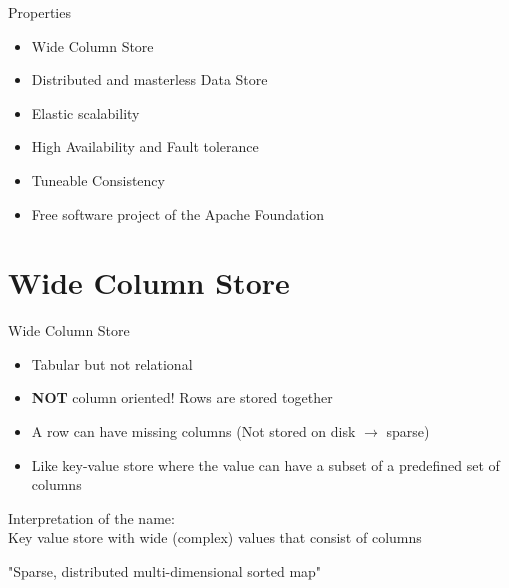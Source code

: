 \documentclass[
  10pt
]{beamer}
\begin{document}
\begin{frame}{Properties}
  \begin{itemize}
    \item<1-> Wide Column Store
    \item<2-> Distributed and masterless Data Store
    \item<4-> Elastic scalability
    \item<5-> High Availability and Fault tolerance
    \item<6-> Tuneable Consistency
    \item<7-> Free software project of the Apache Foundation

  \end{itemize}
\end{frame}

\section{Wide Column Store}  %
\begin{frame}{Wide Column Store}
  \begin{itemize}
    \item<1-> Tabular but not relational
    \item<2-> \textbf{NOT} column oriented! Rows are stored together
    \item<3-> A row can have missing columns (Not stored on disk $\rightarrow$ sparse)
    \item<4-> Like key-value store where the value can have a subset of a predefined set of columns
  \end{itemize}

  Interpretation of the name: \\
  Key value store with wide (complex) values that consist of columns

  "Sparse, distributed multi-dimensional sorted map" \cite{cassandra_paper}

\end{frame}
\end{document}
